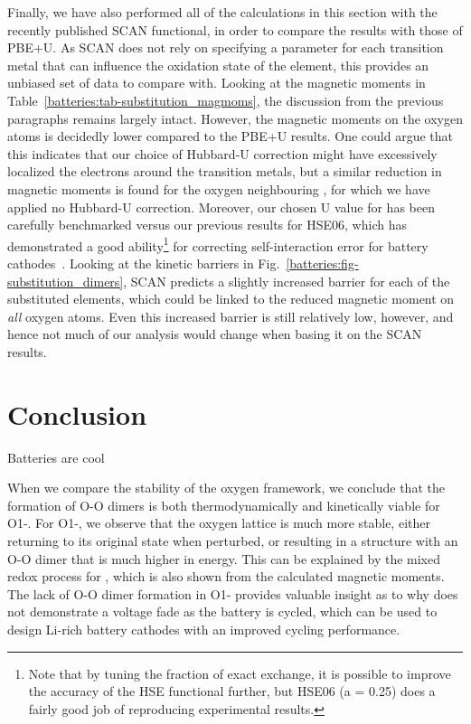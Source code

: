 \begin{refsection}
Finally, we have also performed all of the calculations in this section with 
the recently published SCAN functional, in order to compare the results with 
those of PBE+U. As SCAN does not rely on specifying a parameter for each 
transition metal that can influence the oxidation state of the element, this 
provides an unbiased set of data to compare with. Looking at the magnetic 
moments in Table~\ref{batteries:tab-substitution_magmoms}, the discussion from 
the previous paragraphs remains largely intact. However, the magnetic moments 
on the oxygen atoms is decidedly lower compared to the PBE+U results. One 
could argue that this indicates that our choice of Hubbard-U correction might 
have excessively localized the electrons around the transition metals, but a 
similar reduction in magnetic moments is found for the oxygen neighbouring 
, for which we have applied no Hubbard-U correction. Moreover, our 
chosen U value for  has been carefully benchmarked versus our previous 
results for HSE06, which has demonstrated a good ability\footnote{Note that by 
tuning the fraction of exact exchange, it is possible to improve the accuracy 
of the HSE functional further, but HSE06 (a = 0.25) does a fairly good job of 
reproducing experimental results.} for correcting self-interaction error for 
battery cathodes~\cite{Seo2015}. Looking at the kinetic barriers in 
Fig.~\ref{batteries:fig-substitution_dimers}, SCAN predicts a slightly 
increased barrier for each of the substituted elements, which could be linked 
to the reduced magnetic moment on \textit{all} oxygen atoms. Even this 
increased barrier is still relatively low, however, and hence not much of our 
analysis would change when basing it on the SCAN results. 
 
\section{Conclusion} 
 
 
Batteries are cool 
 
When we compare the stability of the oxygen framework, we conclude that the 
formation of O-O dimers is both thermodynamically and kinetically viable for 
O1-. For O1-, we observe that the oxygen lattice 
is much more stable, either returning to its original state when perturbed, or 
resulting in a structure with an O-O dimer that is much higher in energy. This 
can be explained by the mixed redox process for , which is also 
shown from the calculated magnetic moments. The lack of O-O dimer formation in 
O1- provides valuable insight as to why  does not 
demonstrate a voltage fade as the battery is cycled, which can be used to 
design Li-rich battery cathodes with an improved cycling performance. 
 

\end{refsection}
